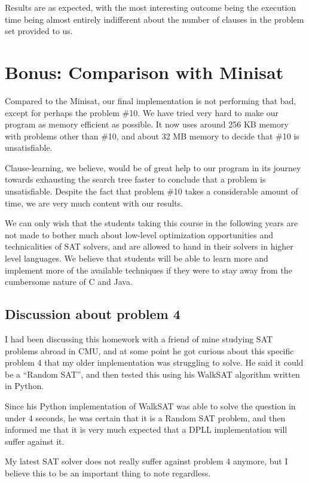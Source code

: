 \documentclass{article}
\begin{document}
Results are as expected, with the most interesting outcome
being the execution time being almost entirely indifferent
about the number of clauses in the problem set provided to us.

\section{Bonus: Comparison with Minisat}

Compared to the Minisat, our final implementation is not
performing that bad, except for perhaps the problem \#10.
We have tried very hard to make our program as memory
efficient as possible. It now uses around 256 KB memory with
problems other than \#10, and about 32 MB memory to
decide that \#10 is unsatisfiable.

Clause-learning, we believe, would be of great help to our
program in its journey towards exhausting the search
tree faster to conclude that a problem is unsatisfiable.
Despite the fact that problem \#10 takes a considerable
amount of time, we are very much content with our results.

We can only wish that the students taking this course in
the following years are not made to bother much about
low-level optimization opportunities and technicalities
of SAT solvers, and are allowed to hand in their
solvers in higher level languages. We believe that
students will be able to learn more and implement more
of the available techniques if they were to stay away
from the cumbersome nature of C and Java.

\subsection{Discussion about problem 4}

I had been discussing this homework with a friend of mine
studying SAT problems abroad in CMU, and at some point
he got curious about this specific problem 4 that my older
implementation was struggling to solve. He said it could
be a ``Random SAT'', and then tested this using
his WalkSAT algorithm written in Python.

Since his Python implementation of WalkSAT was able to
solve the question in under 4 seconds, he was certain
that it is a Random SAT problem, and then informed me
that it is very much expected that a DPLL implementation
will suffer against it.

My latest SAT solver does not really suffer against
problem 4 anymore, but I believe this to be an important
thing to note regardless.
\end{document}
